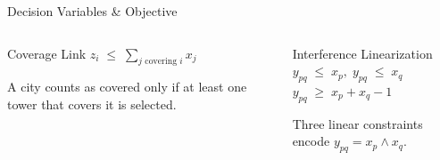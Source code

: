 \begin{frame}[t]{Decision Variables \& Objective}{}
    \vspace{0.3cm}
    \begin{columns}[T]
        \begin{block}{Coverage Link}
            $z_i \;\le\; \displaystyle\sum_{j \text{ covering } i} x_j$
            \vspace{4pt}

            {\footnotesize A city counts as covered only if at least one tower that covers it is selected.}
        \end{block}

        \begin{block}{Interference Linearization}
            $y_{pq} \;\le\; x_p,\; y_{pq} \;\le\; x_q$\\
            $y_{pq} \;\ge\; x_p + x_q - 1$
            \vspace{4pt}

            {\footnotesize Three linear constraints encode $y_{pq} = x_p \land x_q$.}
        \end{block}
    \end{columns}
\end{frame}

